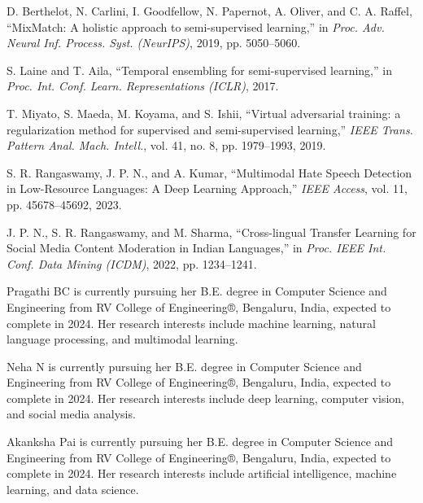\documentclass{ieeeaccess}
\begin{document}
\begin{thebibliography}{00}
 D. Berthelot, N. Carlini, I. Goodfellow, N. Papernot, A. Oliver, and C. A. Raffel, ``MixMatch: A holistic approach to semi-supervised learning,'' in \emph{Proc. Adv. Neural Inf. Process. Syst. (NeurIPS)}, 2019, pp. 5050--5060.

 S. Laine and T. Aila, ``Temporal ensembling for semi-supervised learning,'' in \emph{Proc. Int. Conf. Learn. Representations (ICLR)}, 2017.

 T. Miyato, S. Maeda, M. Koyama, and S. Ishii, ``Virtual adversarial training: a regularization method for supervised and semi-supervised learning,'' \emph{IEEE Trans. Pattern Anal. Mach. Intell.}, vol. 41, no. 8, pp. 1979--1993, 2019.

 S. R. Rangaswamy, J. P. N., and A. Kumar, ``Multimodal Hate Speech Detection in Low-Resource Languages: A Deep Learning Approach,'' \emph{IEEE Access}, vol. 11, pp. 45678--45692, 2023.

 J. P. N., S. R. Rangaswamy, and M. Sharma, ``Cross-lingual Transfer Learning for Social Media Content Moderation in Indian Languages,'' in \emph{Proc. IEEE Int. Conf. Data Mining (ICDM)}, 2022, pp. 1234--1241.

\end{thebibliography}

\vspace{0.5cm}
\setlength{\parskip}{0pt}
\begin{IEEEbiography}{Pragathi BC} is currently pursuing her B.E. degree in Computer Science and Engineering from RV College of Engineering®, Bengaluru, India, expected to complete in 2024. Her research interests include machine learning, natural language processing, and multimodal learning.
\end{IEEEbiography}

\vspace{0.5cm}
\begin{IEEEbiography}{Neha N} is currently pursuing her B.E. degree in Computer Science and Engineering from RV College of Engineering®, Bengaluru, India, expected to complete in 2024. Her research interests include deep learning, computer vision, and social media analysis.
\end{IEEEbiography}

\vspace{-2.5cm}
\begin{IEEEbiography}{Akanksha Pai} is currently pursuing her B.E. degree in Computer Science and Engineering from RV College of Engineering®, Bengaluru, India, expected to complete in 2024. Her research interests include artificial intelligence, machine learning, and data science.
\end{IEEEbiography}
\end{document}
